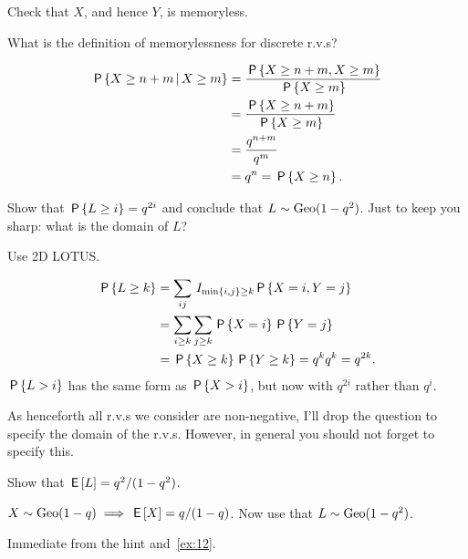 \documentclass[a4paper,11pt]{article}
\renewcommand{\min}[1]{\mathrm{min}\{#1\}}
\begin{document}
\begin{exercise}
Check that $X$, and hence $Y$, is memoryless.
\begin{hint}
What is the definition of memorylessness for discrete r.v.s?
\end{hint}
\begin{solution}
  \begin{align}
    \label{eq:13}
\P{X\geq n+m\given X\geq m}
&= \frac{ \P{X\geq n+m,  X\geq m}}{\P{X\geq m}} \\
&= \frac{ \P{X\geq n+m}}{\P{X\geq m}} \\
&= \frac{ q^{n+m}}{q^m} \\
&= q^n= \P{X\geq n}.
  \end{align}
\end{solution}
\end{exercise}

\begin{exercise}\label{ex:12}
Show that $\P{L\geq i}=q^{2i}$ and conclude that $L\sim\Geo{1-q^{2}}$. Just to keep you sharp: what is the domain of $L$?
\begin{hint}
  Use 2D LOTUS.
\end{hint}
\begin{solution}
  \begin{align}
    \label{eq:12}
\P{L\geq k}
&= \sum_{ij} \1{\min{i,j}\geq k} \P{X=i, Y=j}\\
&= \sum_{i\geq k} \sum_{j\geq k} \P{X=i}\P{Y=j}\\
&=  \P{X\geq k}\P{Y\geq k} = q^{k} q^{k} = q^{2k}.
  \end{align}
$\P{L>i}$ has the same form as $\P{X>i}$, but now with $q^{2i}$ rather than $q^{i}$.
\end{solution}
\end{exercise}

As henceforth all r.v.s we consider are non-negative, I'll drop the question to specify the domain of the r.v.s. However, in general you should not forget to specify this.



\begin{exercise}\label{ex:3}
Show that  $\E L=q^{2}/(1-q^{2})$.
\begin{hint}
$X\sim \Geo{1-q} \implies \E X = q/(1-q)$. Now use that $L\sim\Geo{1-q^{2}}$.
\end{hint}
\begin{solution}
  Immediate from the hint and~\cref{ex:12}.
\end{solution}
\end{exercise}
\end{document}
